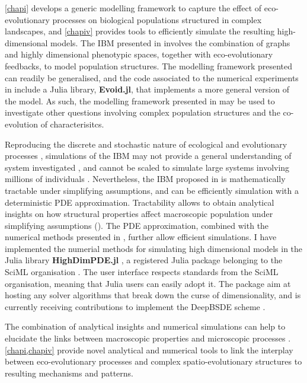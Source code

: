 \cref{chapi} develops a generic modelling framework to capture the effect of eco-evolutionary processes on biological populations structured in complex landscapes, and \cref{chapiv} provides tools to efficiently simulate the resulting high-dimensional models.
% 
The IBM presented in \chapi involves the combination of graphs and highly dimensional phenotypic spaces, together with eco-evolutionary feedbacks, to model population structures. The modelling framework presented can readily be generalised, and the code associated to the numerical experiments in \chapi include a Julia library, \textbf{Evoid.jl}, that implements a more general version of the model. %
% 
As such, the modelling framework presented in \chapi may be used to investigate other questions involving complex population structures and the co-evolution of characterisitcs.

% 
Reproducing the discrete and stochastic nature of ecological and evolutionary processes \cite{Champagnat2006}, simulations of the IBM may not provide a general understanding of system investigated \xxx, and cannot be scaled to simulate large systems involving millions of individuals \xxx. Nevertheless, the IBM proposed in \chapi is mathematically tractable under simplifying assumptions, and can be efficiently simulation with a deterministic PDE approximation.
% 
Tractability allows to obtain analytical insights on how structural properties affect macroscopic population under simplifying assumptions (\chapi).
% 
The PDE approximation, combined with the numerical methods presented in \chapiv, further allow efficient simulations. 
% 
I have implemented the numerial methods for simulating high dimensional models in the Julia library \textbf{HighDimPDE.jl} \cite{HighDimPDE}, a registered Julia package belonging to the SciML organisation \cite{XXX}.
The user interface respects standards from the SciML organisation, meaning that Julia users can easily adopt it.
%
The package aim at hosting any solver algorithms that break down the curse of dimensionality, and is currently receiving contributions to implement the DeepBSDE scheme \cite{Han2018}.

The combination of analytical insights and numerical simulations can help to elucidate the links between macroscopic properties and microscopic processes \cite{Levin}.
% 
\cref{chapi,chapiv} provide novel analytical and numerical tools to link the interplay between eco-evolutionary processes and complex spatio-evolutionary structures to resulting mechanisms and patterns.




